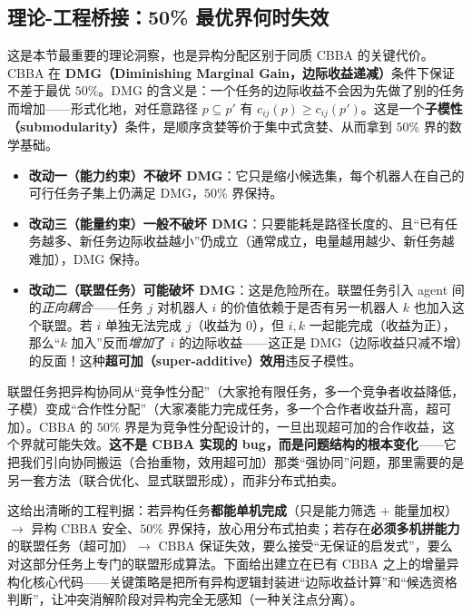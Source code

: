 \subsection{理论-工程桥接：50\% 最优界何时失效}
\label{sec:hmr-cbba-bound}
这是本节最重要的理论洞察，也是异构分配区别于同质 CBBA 的关键代价。CBBA 在 \textbf{DMG（Diminishing Marginal Gain，边际收益递减）}条件下保证不差于最优 $50\%$。DMG 的含义是：一个任务的边际收益不会因为先做了别的任务而增加——形式化地，对任意路径 $p\subseteq p'$ 有 $c_{ij}(p)\ge c_{ij}(p')$。这是一个\textbf{子模性（submodularity）}条件，是顺序贪婪等价于集中式贪婪、从而拿到 $50\%$ 界的数学基础。
\begin{itemize}
  \item \textbf{改动一（能力约束）不破坏 DMG}：它只是缩小候选集，每个机器人在自己的可行任务子集上仍满足 DMG，$50\%$ 界保持。
  \item \textbf{改动三（能量约束）一般不破坏 DMG}：只要能耗是路径长度的、且“已有任务越多、新任务边际收益越小”仍成立（通常成立，电量越用越少、新任务越难加），DMG 保持。
  \item \textbf{改动二（联盟任务）可能破坏 DMG}：这是危险所在。联盟任务引入 agent 间的\emph{正向耦合}——任务 $j$ 对机器人 $i$ 的价值依赖于是否有另一机器人 $k$ 也加入这个联盟。若 $i$ 单独无法完成 $j$（收益为 $0$），但 $i,k$ 一起能完成（收益为正），那么“$k$ 加入”反而\emph{增加}了 $i$ 的边际收益——这正是 DMG（边际收益只减不增）的反面！这种\textbf{超可加（super-additive）效用}违反子模性。
\end{itemize}

\begin{insight}
联盟任务把异构协同从“竞争性分配”（大家抢有限任务，多一个竞争者收益降低，子模）变成“合作性分配”（大家凑能力完成任务，多一个合作者收益升高，超可加）。CBBA 的 $50\%$ 界是为竞争性分配设计的，一旦出现超可加的合作收益，这个界就可能失效。\textbf{这不是 CBBA 实现的 bug，而是问题结构的根本变化}——它把我们引向协同搬运（合抬重物，效用超可加）那类“强协同”问题，那里需要的是另一套方法（联合优化、显式联盟形成），而非分布式拍卖。
\end{insight}

\noindent 这给出清晰的工程判据：若异构任务\textbf{都能单机完成}（只是能力筛选 $+$ 能量加权）$\to$ 异构 CBBA 安全、$50\%$ 界保持，放心用分布式拍卖；若存在\textbf{必须多机拼能力}的联盟任务（超可加）$\to$ CBBA 保证失效，要么接受“无保证的启发式”，要么对这部分任务上专门的联盟形成算法。下面给出建立在已有 CBBA 之上的增量异构化核心代码——关键策略是把所有异构逻辑封装进“边际收益计算”和“候选资格判断”，让冲突消解阶段对异构完全无感知（一种关注点分离）。

